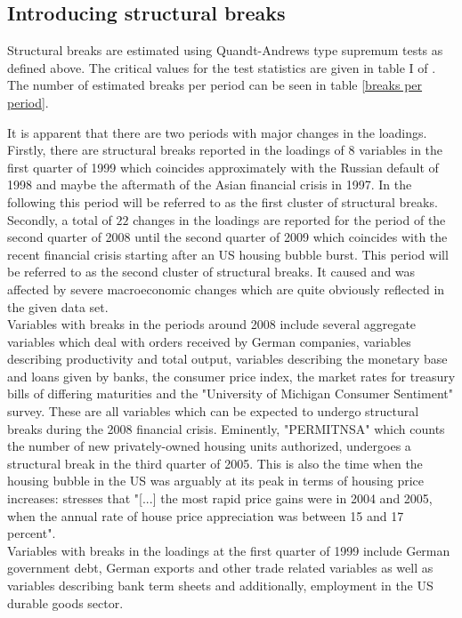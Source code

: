 \documentclass[12pt]{article}
\begin{document}
\clearpage


\subsection{Introducing structural breaks}
Structural breaks are estimated using Quandt-Andrews type supremum tests as defined above. The critical values for the test statistics are given in table I of \citet{andrews2003tests}. The number of estimated breaks per period can be seen in table \ref{breaks per period}.

It is apparent that there are two periods with major changes in the loadings. Firstly, there are structural breaks reported in the loadings of $8$ variables in the first quarter of 1999 which coincides approximately with the Russian default of 1998 and maybe the aftermath of the Asian financial crisis in 1997. In the following this period will be referred to as the first cluster of structural breaks. Secondly, a total of $22$ changes in the loadings are reported for the period of the second quarter of 2008 until the second quarter of 2009 which coincides with the recent financial crisis starting after an US housing bubble burst. This period will be referred to as the second cluster of structural breaks. It caused and was affected by severe macroeconomic changes which are quite obviously reflected in the given data set. \\

Variables with breaks in the periods around 2008 include several aggregate variables which deal with orders received by German companies, variables describing productivity and total output, variables describing the monetary base and loans given by banks, the consumer price index, the market rates for treasury bills of differing maturities and the "University of Michigan Consumer Sentiment" survey. These are all variables which can be expected to undergo structural breaks during the 2008 financial crisis. Eminently, "PERMITNSA" which counts the number of new privately-owned housing units authorized, undergoes a structural break in the third quarter of 2005. This is also the time when the housing bubble in the US was arguably at its peak in terms of housing price increases: \citet{bernanke2010monetary} stresses that "[...] the most rapid price gains were in 2004 and 2005, when the annual rate of house price appreciation was between 15 and 17 percent". \\

Variables with breaks in the loadings at the first quarter of 1999 include German government debt, German exports and other trade related variables as well as variables describing bank term sheets and additionally, employment in the US durable goods sector.
\end{document}
